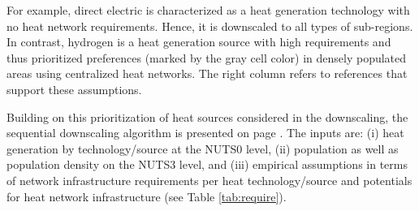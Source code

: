 \vspace{0.3cm}
\begin{table}[h]
	\centering
	\setlength{\extrarowheight}{.5em}
	\caption{Qualitative overview for heat generation technologies/sources and their requirments for heat network infrastructure. The prioritized preferences (gray cell color) of heat sources in sub-regions is marked by the gray color.}
	\label{tab:require}
\end{table}

For example, direct electric is characterized as a heat generation technology with no heat network requirements. Hence, it is downscaled to all types of sub-regions. In contrast, hydrogen is a heat generation source with high requirements and thus prioritized preferences (marked by the gray cell color) in densely populated areas using centralized heat networks. The right column refers to references that support these assumptions.\vspace{0.3cm}

Building on this prioritization of heat sources considered in the downscaling, the sequential downscaling algorithm is presented on page \pageref{Alg:1}. The inputs are: (i) heat generation by technology/source at the NUTS0 level, (ii) population as well as population density on the NUTS3 level, and (iii) empirical assumptions in terms of network infrastructure requirements per heat technology/source and potentials for heat network infrastructure (see Table \ref{tab:require}).

